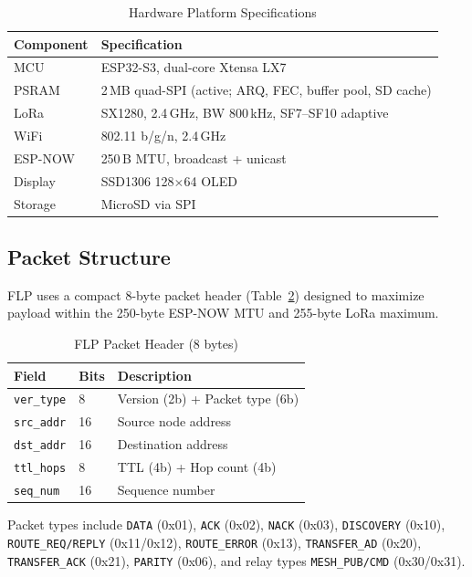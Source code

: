 \documentclass[conference]{IEEEtran}
\begin{document}
\begin{table}[htbp]
  \centering
  \caption{Hardware Platform Specifications}
  \label{tab:hardware}
  \begin{tabular}{@{}ll@{}}
    \toprule
    \textbf{Component} & \textbf{Specification} \\
    \midrule
    MCU & ESP32-S3, dual-core Xtensa LX7 \\
    PSRAM & 2\,MB quad-SPI (active; ARQ, FEC, buffer pool, SD cache) \\
    LoRa & SX1280, 2.4\,GHz, BW 800\,kHz, SF7--SF10 adaptive \\
    WiFi & 802.11 b/g/n, 2.4\,GHz \\
    ESP-NOW & 250\,B MTU, broadcast + unicast \\
    Display & SSD1306 128$\times$64 OLED \\
    Storage & MicroSD via SPI \\
    \bottomrule
  \end{tabular}
\end{table}

\subsection{Packet Structure}

FLP uses a compact 8-byte packet header (Table~\ref{tab:header}) designed to maximize payload within the 250-byte ESP-NOW MTU and 255-byte LoRa maximum.

\begin{table}[htbp]
  \centering
  \caption{FLP Packet Header (8 bytes)}
  \label{tab:header}
  \begin{tabular}{@{}lll@{}}
    \toprule
    \textbf{Field} & \textbf{Bits} & \textbf{Description} \\
    \midrule
    \texttt{ver\_type} & 8 & Version (2b) + Packet type (6b) \\
    \texttt{src\_addr} & 16 & Source node address \\
    \texttt{dst\_addr} & 16 & Destination address \\
    \texttt{ttl\_hops} & 8 & TTL (4b) + Hop count (4b) \\
    \texttt{seq\_num} & 16 & Sequence number \\
    \bottomrule
  \end{tabular}
\end{table}

Packet types include \texttt{DATA} (0x01), \texttt{ACK} (0x02), \texttt{NACK} (0x03), \texttt{DISCOVERY} (0x10), \texttt{ROUTE\_REQ/REPLY} (0x11/0x12), \texttt{ROUTE\_ERROR} (0x13), \texttt{TRANSFER\_AD} (0x20), \texttt{TRANSFER\_ACK} (0x21), \texttt{PARITY} (0x06), and relay types \texttt{MESH\_PUB/CMD} (0x30/0x31).
\end{document}
